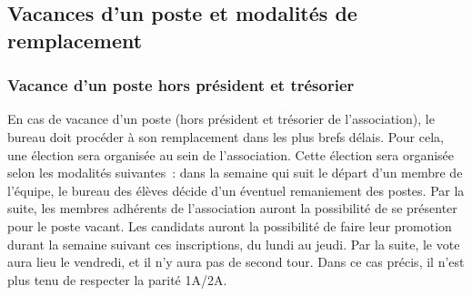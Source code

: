 \documentclass{article} %
\begin{document}
		\subsection{Vacances d'un poste et modalités de remplacement}
\label{sub:vacances_d_un_poste_et_modalites_de_remplacement}

			\subsubsection{Vacance d'un poste hors président et trésorier}
\label{ssub:vacance_d_un_poste_hors_president_et_tresorier}
				En cas de vacance d'un poste (hors président et trésorier de
				l’association), le bureau doit procéder à son remplacement dans les
				plus brefs délais. Pour cela, une élection sera organisée au sein de
				l'association. Cette élection sera organisée selon les modalités
				suivantes : dans la semaine qui suit le départ d’un membre de
				l’équipe, le bureau des élèves décide d’un éventuel remaniement des
				postes. Par la suite, les membres adhérents de l'association auront 
				la possibilité de se présenter pour le poste vacant. Les candidats 
				auront la possibilité de faire leur promotion durant la semaine 
				suivant ces inscriptions, du lundi au jeudi. Par la suite, le vote 
				aura lieu le vendredi, et il n’y aura pas de second tour. Dans ce 
				cas précis, il n’est plus tenu de respecter la parité 1A/2A.
		
\end{document}
